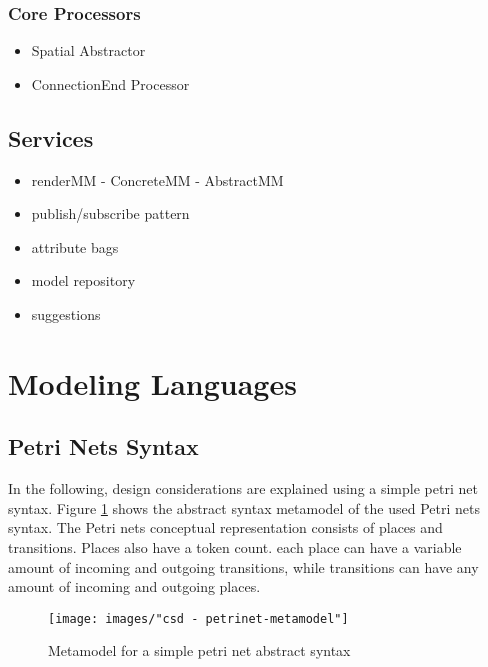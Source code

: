 \subsubsection{Core Processors}
\begin{itemize}
  \item Spatial Abstractor 
  \item ConnectionEnd Processor
\end{itemize}

\subsection{Services}



\begin{itemize}
  \item renderMM - ConcreteMM - AbstractMM
  \item publish/subscribe pattern
  \item attribute bags
  \item model repository
  \item suggestions
\end{itemize}

\section{Modeling Languages}

\comment{\dots}

\subsection{Petri Nets Syntax}
\label{sec:petrinets}
In the following, design considerations are explained using a simple petri net syntax. Figure \ref{fig:petrinets_metamodel} shows the abstract syntax metamodel of the used Petri nets syntax. The Petri nets conceptual representation consists of places and transitions. Places also have a token count. each place can have a variable amount of incoming and outgoing transitions, while transitions can have any amount of incoming and outgoing places. 

\begin{figure}[H]
  \centering
  \texttt{[image: images/"csd - petrinet-metamodel"]}
  \caption{Metamodel for a simple petri net abstract syntax}
  \label{fig:petrinets_metamodel}
\end{figure}

